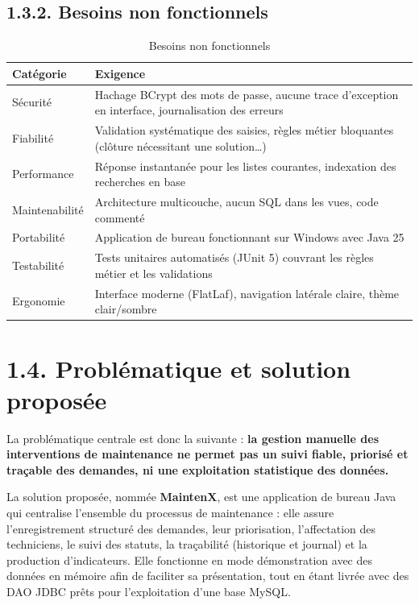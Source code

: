 \documentclass[11pt,a4paper]{report}
\begin{document}
\subsection*{1.3.2. Besoins non fonctionnels}
\begin{table}[htbp]\centering\small
\begin{tabularx}{\textwidth}{|p{3.8cm}|X|}
\hline\rowcolor{hdr}\textbf{Catégorie} & \textbf{Exigence}\\ \hline
Sécurité & Hachage BCrypt des mots de passe, aucune trace d'exception en interface, journalisation des erreurs\\ \hline
Fiabilité & Validation systématique des saisies, règles métier bloquantes (clôture nécessitant une solution…) \\ \hline
Performance & Réponse instantanée pour les listes courantes, indexation des recherches en base\\ \hline
Maintenabilité & Architecture multicouche, aucun SQL dans les vues, code commenté\\ \hline
Portabilité & Application de bureau fonctionnant sur Windows avec Java 25\\ \hline
Testabilité & Tests unitaires automatisés (JUnit 5) couvrant les règles métier et les validations\\ \hline
Ergonomie & Interface moderne (FlatLaf), navigation latérale claire, thème clair/sombre\\ \hline
\end{tabularx}
\caption{Besoins non fonctionnels}
\end{table}
\section*{1.4. Problématique et solution proposée}

La problématique centrale est donc la suivante : \textbf{la gestion manuelle des interventions de maintenance ne permet pas un suivi fiable, priorisé et traçable des demandes, ni une exploitation statistique des données.}

La solution proposée, nommée \textbf{MaintenX}, est une application de bureau Java qui centralise l'ensemble du processus de maintenance : elle assure l'enregistrement structuré des demandes, leur priorisation, l'affectation des techniciens, le suivi des statuts, la traçabilité (historique et journal) et la production d'indicateurs. Elle fonctionne en mode démonstration avec des données en mémoire afin de faciliter sa présentation, tout en étant livrée avec des DAO JDBC prêts pour l'exploitation d'une base MySQL.
\end{document}
